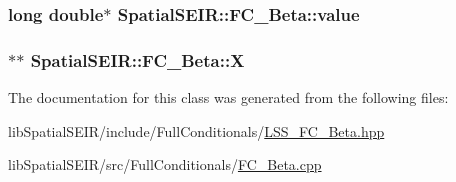 \hypertarget{classSpatialSEIR_1_1FC__Beta_aae2fb964cd80bfa9eba448f2075640d5}{
\subsubsection[{value}]{\setlength{\rightskip}{0pt plus 5cm}long double$\ast$ Spatial\-S\-E\-I\-R\-::\-F\-C\-\_\-\-Beta\-::value}}\label{classSpatialSEIR_1_1FC__Beta_aae2fb964cd80bfa9eba448f2075640d5}
\hypertarget{classSpatialSEIR_1_1FC__Beta_a3619f98f776ef5ab826350177e2f1326}{
\subsubsection[{X}]{$\ast$$\ast$ Spatial\-S\-E\-I\-R\-::\-F\-C\-\_\-\-Beta\-::\-X}}\label{classSpatialSEIR_1_1FC__Beta_a3619f98f776ef5ab826350177e2f1326}


The documentation for this class was generated from the following files\-:\begin{DoxyCompactItemize}
\item 
lib\-Spatial\-S\-E\-I\-R/include/\-Full\-Conditionals/\hyperlink{LSS__FC__Beta_8hpp}{L\-S\-S\-\_\-\-F\-C\-\_\-\-Beta.\-hpp}\item 
lib\-Spatial\-S\-E\-I\-R/src/\-Full\-Conditionals/\hyperlink{FC__Beta_8cpp}{F\-C\-\_\-\-Beta.\-cpp}\end{DoxyCompactItemize}

